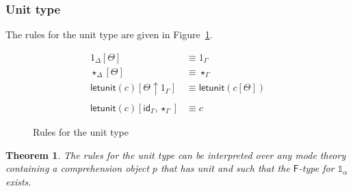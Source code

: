 \documentclass[10pt]{article}
\newtheorem{theorem}{Theorem}
\theoremstyle{definition}
\newcommand{\TYPE}{\,\,\mathsf{Type}}
\newcommand{\id}{\mathsf{id}}
\newcommand{\qyields}{\Vdash}
\newcommand\One{\ensuremath{\mathds{1}}}
\newcommand\qunitmatch[1]{\ensuremath{\mathsf{letunit}(#1)}}
\begin{document}
\subsubsection{Unit type}
The rules for the unit type are given in Figure~\ref{fig:qit-unit-rules}.

\begin{figure}
\begin{align}
1_\Delta[\Theta] &\equiv 1_\Gamma \\
\star_\Delta[\Theta] &\equiv \star_\Gamma \\ 
\qunitmatch{c}[\Theta \uparrow 1_\Gamma] &\equiv \qunitmatch{c[\Theta]} \\
\nonumber \\
\qunitmatch{c}[\id_\Gamma, \star_\Gamma] &\equiv c
\end{align}
\caption{Rules for the unit type}\label{fig:qit-unit-rules}
\end{figure}

\begin{theorem}
The rules for the unit type can be interpreted over any mode theory containing a comprehension object $p$ that has unit and such that the $\mathsf{F}$-type for $\One_\alpha$ exists.
\end{theorem}
\end{document}
